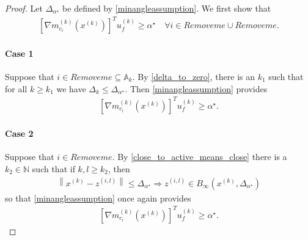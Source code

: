 \documentclass{article}
\theoremstyle{case}
\numberwithin{theorem}{subsection}
\newcommand{\activeconstraintsk}{{\mathbb A_{k}}}
\newcommand{\dk}{\Delta_k}
\newcommand{\dl}{\Delta_l}
\newcommand{\gmcik}{{\nabla m_{c_i}^{(k)}\left(\xk\right)}}
\newcommand{\minanglealpha}{{ \alpha^{\star} }}
\newcommand{\minangledelta}{{\Delta_{\alpha^{\star}}}}
\newcommand{\naturals}{\mathbb N}
\newcommand{\xk}{x^{(k)}}
\newcommand{\xl}{{x^{(l)}}}
\newcommand{\zil}{{z^{(i, l)}}}
\newcommand{\minangledirk}{{u^{(k)}_f}}
\newcommand{\activeprojk}{{Remove me}}
\newcommand{\activeprojl}{{Remove me}}
\begin{document}
\begin{proof}
Let $\minangledelta$ be defined by \cref{minangleassumption}.
We first show that 
\begin{align*}
\left[\gmcik\right]^T \minangledirk \ge \minanglealpha \quad \forall i \in \activeprojk \cup \activeprojl.
\end{align*}


\paragraph{Case 1}
Suppose that $i \in \activeprojk \subseteq \activeconstraintsk$.
By \cref{delta_to_zero}, there is an $k_1$ such that for all $k \ge k_1$ we have $\dk \le \minangledelta$.
Then \cref{minangleassumption} provides
\begin{align*}
\left[\gmcik\right]^T \minangledirk \ge \minanglealpha.
\end{align*}

\paragraph{Case 2}
Suppose that $i \in \activeprojl$.
By \cref{close_to_active_means_close} there is a $k_2 \in \naturals$ such that if 
$k, l \ge k_2$, then
\begin{align*}
\left\| \xk - \zil \right\| \le \minangledelta
\Longrightarrow
\zil \in B_{\infty}\left(\xk, \minangledelta \right)
\end{align*}
so that \cref{minangleassumption} once again provides
\begin{align*}
\left[\gmcik\right]^T \minangledirk \ge \minanglealpha.
\end{align*}


\end{proof}
\end{document}
